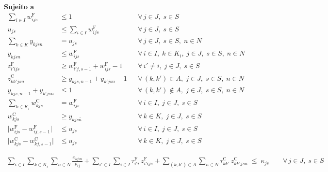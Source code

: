 \documentclass[fleqn,12pt,a4paper]{article}
\begin{document}
\noindent\textbf{Sujeito a}
\begin{align}
\sum_{i \in I} w^{\mathrm{F}}_{ijs} &\le 1
    && \forall\, j \in J,\; s \in S \label{eq:forma_unica} \\
u_{js} &\le \sum_{i \in I} w^{\mathrm{F}}_{ijs}
    && \forall\, j \in J,\; s \in S \label{eq:maquina_ativa} \\
\sum_{k \in K} y_{kjsn} &= u_{js}
    && \forall\, j \in J,\; s \in S,\; n \in N \label{eq:posicao_ocupada} \\
y_{kjsn} &\le w^{\mathrm{F}}_{ijs}
    && \forall\, i \in I,\; k \in K_i,\; j \in J,\; s \in S,\; n \in N \label{eq:forma_da_posicao} \\
z^{\mathrm{F}}_{i'ijs} &\ge w^{\mathrm{F}}_{i'j,s-1} + w^{\mathrm{F}}_{ijs} - 1
    && \forall\, i' \neq i,\; j \in J,\; s \in S \label{eq:troca_forma} \\
z^{\mathrm{C}}_{kk'jsn} &\ge y_{kjs,n-1} + y_{k'jsn} - 1
    && \forall\, (k,k') \in A,\; j \in J,\; s \in S,\; n \in N \label{eq:troca_cor} \\
y_{kjs,n-1} + y_{k'jsn} &\le 1
    && \forall\, (k,k') \notin A,\; j \in J,\; s \in S,\; n \in N \label{eq:transicao_proibida} \\
\sum_{k \in K_i} w^{\mathrm{C}}_{kjs} &= w^{\mathrm{F}}_{ijs}
    && \forall\, i \in I,\; j \in J,\; s \in S \label{eq:estado_cor} \\
w^{\mathrm{C}}_{kjs} &\ge y_{kjs\bar{n}}
    && \forall\, k \in K,\; j \in J,\; s \in S \label{eq:estado_ultima} \\
\bigl| w^{\mathrm{F}}_{ijs} - w^{\mathrm{F}}_{ij,s-1} \bigr| &\le u_{js}
    && \forall\, i \in I,\; j \in J,\; s \in S \label{eq:carryover_forma} \\
\bigl| w^{\mathrm{C}}_{kjs} - w^{\mathrm{C}}_{kj,s-1} \bigr| &\le u_{js}
    && \forall\, k \in K,\; j \in J,\; s \in S \label{eq:carryover_cor}
\end{align}
\begin{ceqn}
\begin{equation}
\begin{aligned}
\sum_{i \in I}\sum_{k \in K_i}\sum_{n \in N} \frac{x_{kjsn}}{p_{ij}}
    + \sum_{i' \in I}\sum_{i \in I} \tau^{\mathrm{F}}_{i'i}\, z^{\mathrm{F}}_{i'ijs}
    + \sum_{(k,k') \in A}\sum_{n \in N} \tau^{\mathrm{C}}_{kk'}\, z^{\mathrm{C}}_{kk'jsn}
    \;\le\; \kappa_{js}
    \qquad \forall\, j \in J,\; s \in S
\end{aligned}
\label{eq:capacidade_turno}
\end{equation}
\end{ceqn}
\end{document}
